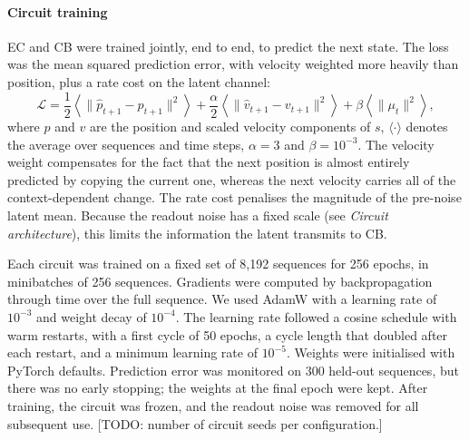 \paragraph{Circuit training}
EC and CB were trained jointly, end to end, to predict the next state. The loss was the mean squared prediction error, with velocity weighted more heavily than position, plus a rate cost on the latent channel:
\begin{equation}
    \mathcal{L} = \frac{1}{2}\left\langle \lVert \hat{p}_{t+1} - p_{t+1} \rVert^2 \right\rangle
    + \frac{\alpha}{2}\left\langle \lVert \hat{v}_{t+1} - v_{t+1} \rVert^2 \right\rangle
    + \beta \left\langle \lVert \mu_t \rVert^2 \right\rangle ,
\end{equation}
where $p$ and $v$ are the position and scaled velocity components of $s$, $\langle \cdot \rangle$ denotes the average over sequences and time steps, $\alpha = 3$ and $\beta = 10^{-3}$. The velocity weight compensates for the fact that the next position is almost entirely predicted by copying the current one, whereas the next velocity carries all of the context-dependent change. The rate cost penalises the magnitude of the pre-noise latent mean. Because the readout noise has a fixed scale (see \textit{Circuit architecture}), this limits the information the latent transmits to CB.

Each circuit was trained on a fixed set of 8{,}192 sequences for 256 epochs, in minibatches of 256 sequences. Gradients were computed by backpropagation through time over the full sequence. We used AdamW with a learning rate of $10^{-3}$ and weight decay of $10^{-4}$. The learning rate followed a cosine schedule with warm restarts, with a first cycle of 50 epochs, a cycle length that doubled after each restart, and a minimum learning rate of $10^{-5}$. Weights were initialised with PyTorch defaults. Prediction error was monitored on 300 held-out sequences, but there was no early stopping; the weights at the final epoch were kept. After training, the circuit was frozen, and the readout noise was removed for all subsequent use. [TODO: number of circuit seeds per configuration.]


